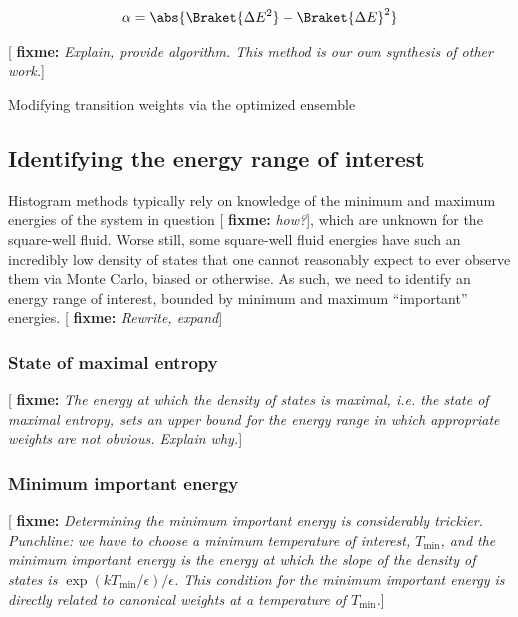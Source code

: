\documentclass[11pt]{article}
\newcommand{\bk}{\Braket} %
\renewcommand{\t}{\text} %
\newcommand{\p}[1]{\left(#1\right)} %
\newcommand{\red}[1]{{\bf \color{red} #1}}
\newcommand{\fixme}[1]{[\red{fixme:} \emph{#1}]}
\begin{document}
\begin{align}
  \alpha=\abs{\bk{\Delta E^2}-\bk{\Delta E}^2}
\end{align}



\fixme{Explain, provide algorithm. This method is our own synthesis of
  other work.}

\begin{algorithm}[H]
  \caption{Modifying transition weights via the optimized ensemble}
  \label{alg:oetmmc}
\end{algorithm}


\subsection{Identifying the energy range of interest}
\label{sec:energy_range}

Histogram methods typically rely on knowledge of the minimum and
maximum energies of the system in question \fixme{how?}, which are
unknown for the square-well fluid. Worse still, some square-well fluid
energies have such an incredibly low density of states that one cannot
reasonably expect to ever observe them via Monte Carlo, biased or
otherwise. As such, we need to identify an energy range of interest,
bounded by minimum and maximum ``important'' energies. \fixme{Rewrite,
  expand}

\subsubsection{State of maximal entropy}
\label{sec:max_entropy}

\fixme{The energy at which the density of states is maximal, i.e. the
  state of maximal entropy, sets an upper bound for the energy range
  in which appropriate weights are not obvious. Explain why.}

\subsubsection{Minimum important energy}
\label{sec:min_energy}

\fixme{Determining the minimum important energy is considerably
  trickier. Punchline: we have to choose a minimum temperature of
  interest, $T_{\t{min}}$, and the minimum important energy is the
  energy at which the slope of the density of states is
  $\exp\p{kT_{\t{min}}/\epsilon}/\epsilon$. This condition for the
  minimum important energy is directly related to canonical weights at
  a temperature of $T_{\t{min}}$.}
\end{document}

